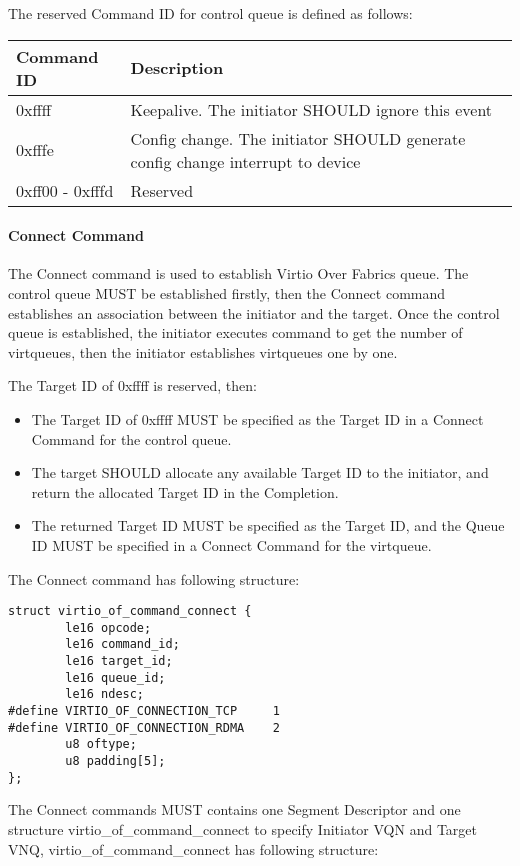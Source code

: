 The reserved Command ID for control queue is defined as follows:

\begin{tabular}{ |l|l| }
\hline
Command ID & Description \\
\hline \hline
0xffff & Keepalive. The initiator SHOULD ignore this event \\
\hline
0xfffe & Config change. The initiator SHOULD generate config change interrupt to device \\
\hline
0xff00 - 0xfffd & Reserved \\
\hline
\end{tabular}

\paragraph{Connect Command}\label{sec:Virtio Transport Options / Virtio Over Fabrics / Transmition Protocol / Commands Definition / Connect Command}
The Connect command is used to establish Virtio Over Fabrics queue. The control queue MUST be established firstly, then the Connect command establishes an association between the initiator and the target. Once the control queue is established, the initiator executes command to get the number of virtqueues, then the initiator establishes virtqueues one by one.

The Target ID of 0xffff is reserved, then:
\begin{itemize}
\item The Target ID of 0xffff MUST be specified as the Target ID in a Connect Command for the control queue.
\item The target SHOULD allocate any available Target ID to the initiator, and return the allocated Target ID in the Completion.
\item The returned Target ID MUST be specified as the Target ID, and the Queue ID MUST be specified in a Connect Command for the virtqueue.
\end{itemize}

The Connect command has following structure:

\begin{lstlisting}
struct virtio_of_command_connect {
        le16 opcode;
        le16 command_id;
        le16 target_id;
        le16 queue_id;
        le16 ndesc;
#define VIRTIO_OF_CONNECTION_TCP     1
#define VIRTIO_OF_CONNECTION_RDMA    2
        u8 oftype;
        u8 padding[5];
};
\end{lstlisting}

The Connect commands MUST contains one Segment Descriptor and one structure virtio_of_command_connect to specify Initiator VQN and Target VNQ, virtio_of_command_connect has following structure:

